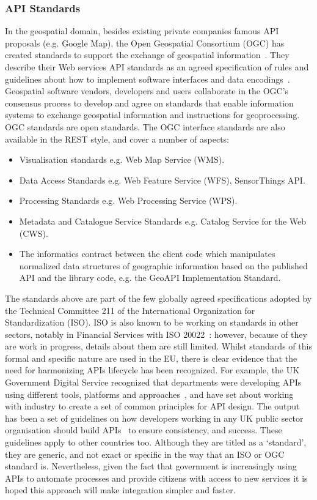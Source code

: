 \subsubsection{API Standards}

In the geospatial domain, besides existing private companies famous API proposals
(e.g. Google Map), the Open Geospatial Consortium (OGC) has created standards to
support the exchange of geospatial information~\citep{opengeospatial}. They describe their Web services
API standards as an agreed specification of rules and guidelines about how to
implement software interfaces and data encodings~\citep{opengeospatial_elearning}. Geospatial software vendors,
developers and users collaborate in the OGC’s consensus process to develop and
agree on standards that enable information systems to exchange geospatial
information and instructions for geoprocessing. OGC standards are open standards.
The OGC interface standards are also available in the REST style, and cover a
number of aspects:
\begin{itemize}
	\item Visualisation standards e.g. Web Map Service (WMS).
	\item Data Access Standards e.g. Web Feature Service (WFS), SensorThings API.
	\item Processing Standards e.g. Web Processing Service (WPS).
	\item Metadata and Catalogue Service Standards e.g. Catalog Service for the Web (CWS).
	\item The informatics contract between the client code which manipulates normalized
	data structures of geographic information based on the published API and the library
	code, e.g. the GeoAPI Implementation Standard.
\end{itemize}

The standards above are part of the few globally agreed specifications adopted by
the Technical Committee 211 of the International Organization for Standardization
(ISO). ISO is also known to be working on standards in other sectors, notably in
Financial Services with ISO 20022~\citep{iso}: however, because of they are work in
progress,
details about them are still limited. Whilst standards of this formal and specific
nature are used in the EU, there is clear evidence that the need for harmonizing
APIs lifecycle has been recognized. For example, the UK Government Digital Service
recognized that departments were developing APIs using different tools, platforms
and approaches~\citep{tech_gov}, and have set about working with industry to create a set of
common principles for API design. The output has been a set of guidelines on how
developers working in any UK public sector organisation should build APIs~\citep{gov_uk_api} to
ensure consistency, and success. These guidelines apply to other countries too.
Although they are titled as a ‘standard’, they
are generic, and not exact or specific in the way that an ISO or OGC standard is.
Nevertheless, given the fact that government is increasingly using APIs to
automate processes and provide citizens with access to new services it is hoped
this approach will make integration simpler and faster.